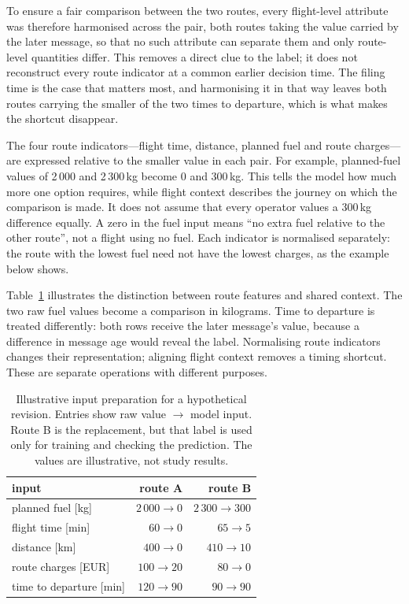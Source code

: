 \documentclass[conference,10pt,a4paper,IEEEoverridecommandlockouts]{IEEEtran}
\begin{document}
To ensure a
fair comparison between the two routes, every flight-level attribute was
therefore harmonised across the pair, both routes taking the value carried
by the later message, so that no such attribute can separate them and only
route-level quantities differ. This removes a direct clue to the label;
it does not reconstruct every route indicator at a common earlier
decision time. The filing time is the case that matters
most, and harmonising it in that way leaves both routes carrying the
smaller of the two times to departure, which is what makes the shortcut
disappear.

The four route indicators---flight time, distance, planned fuel and
route charges---are expressed relative to the smaller value in each
pair. For example, planned-fuel values of 2\,000 and 2\,300\,kg become
0 and 300\,kg. This tells the model how much more one option requires,
while flight context describes the journey on which the comparison is
made. It does not assume that every operator values a 300\,kg difference
equally. A zero in the fuel input means ``no extra fuel relative to the
other route'', not a flight using no fuel. Each indicator is normalised
separately: the route with the lowest fuel need not have the lowest
charges, as the example below shows.

Table~\ref{tab:encoding-example} illustrates the distinction between
route features and shared context. The two raw fuel values become a
comparison in kilograms. Time to departure is treated differently:
both rows receive the later message's value, because a difference in
message age would reveal the label. Normalising route indicators
changes their representation; aligning flight context removes a timing
shortcut. These are separate operations with different purposes.

\begin{table}[t]
\caption{Illustrative input preparation for a hypothetical revision.
Entries show raw value $\rightarrow$ model input. Route B is the
replacement, but that label is used only for training and checking the
prediction. The values are illustrative, not study results.}
\label{tab:encoding-example}
\centering\footnotesize
\begin{tabular}{lrr}
\toprule
input & route A & route B \\
\midrule
planned fuel [kg] & $2\,000\rightarrow0$ & $2\,300\rightarrow300$ \\
flight time [min] & $60\rightarrow0$ & $65\rightarrow5$ \\
distance [km] & $400\rightarrow0$ & $410\rightarrow10$ \\
route charges [EUR] & $100\rightarrow20$ & $80\rightarrow0$ \\
time to departure [min] & $120\rightarrow90$ & $90\rightarrow90$ \\
\bottomrule
\end{tabular}
\end{table}
\end{document}
